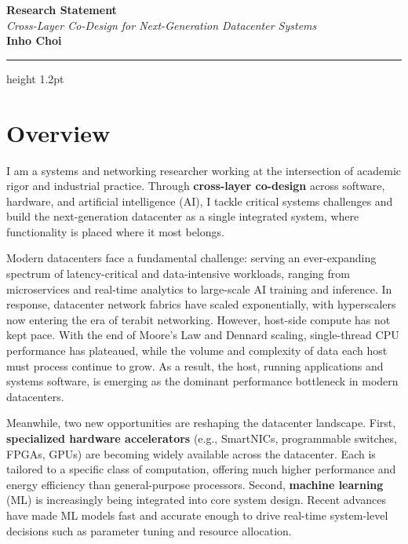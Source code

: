 \documentclass[11pt,letterpaper]{article}
\makeatletter
\newcommand{\keyterm}[1]{\textbf{\color{darkgray}#1}}
\newcommand{\rstitle}{
  \begin{center}
    {\Huge\bfseries\color{accent} Research Statement} \\[4pt]
    {\large\itshape\color{darkgray} Cross-Layer Co-Design for Next-Generation Datacenter Systems} \\[8pt]
    {\Large\bfseries Inho Choi}
  \end{center}
  \vspace{14pt}
  {\color{accent}\hrule height 1.2pt}
  \vspace{10pt}
}
\makeatother
\begin{document}
\rstitle

\section{Overview}
I am a systems and networking researcher working at the intersection of academic rigor and industrial practice.
Through \keyterm{cross-layer co-design} across software, hardware, and artificial intelligence (AI), I tackle critical systems challenges and build the next-generation datacenter as a single integrated system, where functionality is placed where it most belongs.

Modern datacenters face a fundamental challenge: serving an ever-expanding spectrum of latency-critical and data-intensive workloads, ranging from microservices and real-time analytics to large-scale AI training and inference. In response, datacenter network fabrics have scaled exponentially, with hyperscalers now entering the era of terabit networking. However, host-side compute has not kept pace. With the end of Moore's Law and Dennard scaling, single-thread CPU performance has plateaued, while the volume and complexity of data each host must process continue to grow. As a result, the host, running applications and systems software, is emerging as the dominant performance bottleneck in modern datacenters.

Meanwhile, two new opportunities are reshaping the datacenter landscape. First, \keyterm{specialized hardware accelerators} (e.g., SmartNICs, programmable switches, FPGAs, GPUs) are becoming widely available across the datacenter. Each is tailored to a specific class of computation, offering much higher performance and energy efficiency than general-purpose processors. Second, \keyterm{machine learning} (ML) is increasingly being integrated into core system design. Recent advances have made ML models fast and accurate enough to drive real-time system-level decisions such as parameter tuning and resource allocation.
\end{document}
